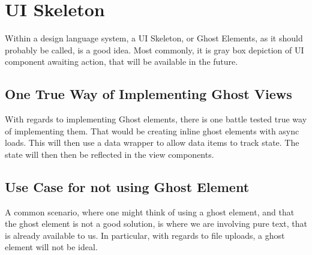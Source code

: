 \section{ UI Skeleton }
\maketitle{}

Within a design language system, a UI Skeleton, or Ghost Elements, as it should
probably be called, is a good idea. Most commonly, it is gray box depiction of
UI component awaiting action, that will be available in the future.

\subsection{ One True Way of Implementing Ghost Views }
With regards to implementing Ghost elements, there is one battle tested true
way of implementing them. That would be creating inline ghost elements with
async loads. This will then use a data wrapper to allow data items to track
state. The state will then then be reflected in the view components.


\subsection{Use Case for not using Ghost Element}
A common scenario, where one might think of using a ghost element, and that the
ghost element is not a good solution, is where we are involving pure text, that
is already available to us. In particular, with regards to file uploads, a
ghost element will not be ideal.
